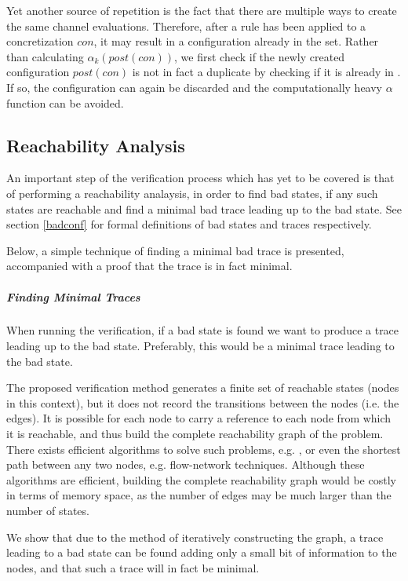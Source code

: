 Yet another source of repetition is the fact that there are multiple ways to create the same channel evaluations. Therefore, after a rule has been applied to a concretization $con$, it may result in a configuration already in the set. Rather than calculating $\alpha_k(post(con))$, we first check if the newly created configuration $post(con)$ is not in fact a duplicate by checking if it is already in . If so, the configuration can again be discarded and the computationally heavy $\alpha$ function can be avoided.


\subsection{Reachability Analysis}
An important step of the verification process which has yet to be covered is that of performing a reachability analaysis, in order to find bad states, if any such states are reachable and find a minimal bad trace leading up to the bad state. See section \ref{badconf} for formal definitions of bad states and traces respectively.

Below, a simple technique of finding a minimal bad trace is presented, accompanied with a proof that the trace is in fact minimal.

\subparagraph{Finding Minimal Traces}
When running the verification, if a bad state is found we want to produce a trace leading up to the bad state. Preferably, this would be a minimal trace leading to the bad state.

The proposed verification method generates a finite set of reachable states (nodes in this context), but it does not record the transitions between the nodes (i.e. the edges). It is possible for each node  to carry a reference to each node  from which it is reachable, and thus build the complete reachability graph of the problem. There exists efficient algorithms to solve such problems, e.g. , or even the shortest path between any two nodes, e.g. flow-network techniques. Although these algorithms are efficient, building the complete reachability graph would be costly in terms of memory space, as the number of edges may be much larger than the number of states.

We show that due to the method of iteratively constructing the graph, a trace leading to a bad state can be found adding only a small bit of information to the nodes, and that such a trace will in fact be minimal.

